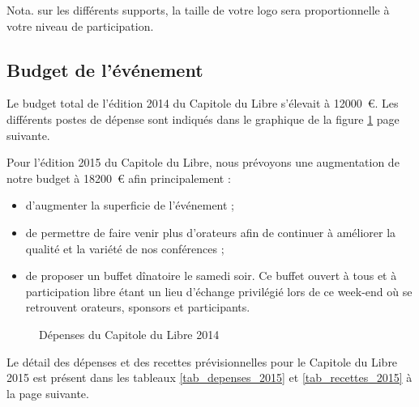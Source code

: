 Nota. sur les différents supports, la taille de votre logo sera proportionnelle à votre niveau de participation.

	\subsection{Budget de l’événement}

Le budget total de l'édition 2014 du Capitole du Libre s'élevait à
 \SI{12000}{\euro}. Les différents postes de dépense sont indiqués dans
 le graphique de la figure \ref{fig_budget} page suivante.

Pour l'édition 2015 du Capitole du Libre, nous prévoyons une augmentation de notre budget à \SI{18200}{€} afin principalement :
\begin{itemize}[label=$\bullet$]
\item d'augmenter la superficie de l'événement ;
\item de permettre de faire venir plus d'orateurs afin de continuer à améliorer la qualité et la variété de nos conférences ;
\item de proposer un buffet dînatoire le samedi soir. Ce buffet ouvert à tous et à participation libre étant un lieu d'échange privilégié lors de ce week-end où se retrouvent orateurs, sponsors et participants.
\end{itemize}

\begin{figure}
\begin{center}
\end{center}
\caption{Dépenses du Capitole du Libre 2014}\label{fig_budget}
\end{figure}

\Separateur

Le détail des dépenses et des recettes prévisionnelles pour le Capitole du Libre 2015 est présent dans les tableaux \ref{tab_depenses_2015} et \ref{tab_recettes_2015} à la page suivante.

